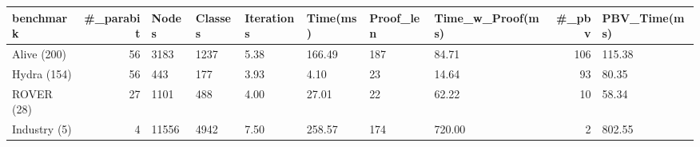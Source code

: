 \begin{tabular}{lrllllllrl}
\toprule
benchmark & #_parabit & Nodes & Classes & Iterations & Time(ms) & Proof_len & Time_w_Proof(ms) & #_pbv & PBV_Time(ms) \\
\midrule
Alive (200) & 56 & 3183 & 1237 & 5.38 & 166.49 & 187 & 84.71 & 106 & 115.38 \\
Hydra (154) & 56 & 443 & 177 & 3.93 & 4.10 & 23 & 14.64 & 93 & 80.35 \\
ROVER (28) & 27 & 1101 & 488 & 4.00 & 27.01 & 22 & 62.22 & 10 & 58.34 \\
Industry (5) & 4 & 11556 & 4942 & 7.50 & 258.57 & 174 & 720.00 & 2 & 802.55 \\
\bottomrule
\end{tabular}

